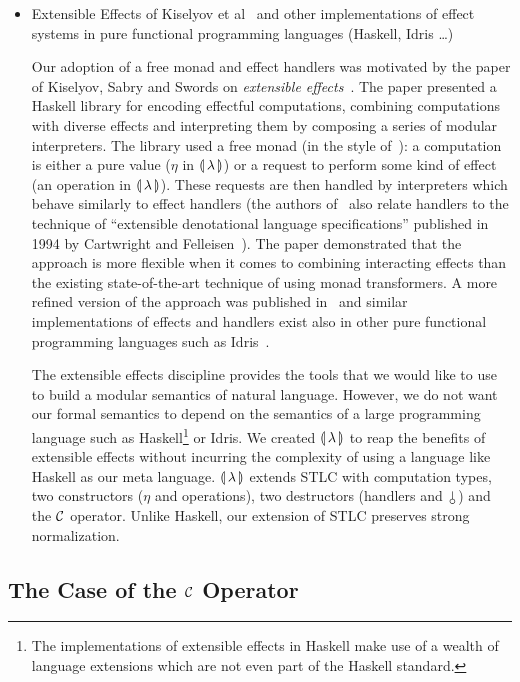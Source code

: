 \begin{itemize}
\item Extensible Effects of Kiselyov et al~\cite{kiselyov2013extensible}
  and other implementations of effect systems in pure functional
  programming languages (Haskell, Idris \ldots)

  Our adoption of a free monad and effect handlers was motivated by the
  paper of Kiselyov, Sabry and Swords on \emph{extensible
    effects}~\cite{kiselyov2013extensible}. The paper presented a Haskell
  library for encoding effectful computations, combining computations with
  diverse effects and interpreting them by composing a series of modular
  interpreters. The library used a free monad (in the style
  of~\cite{swierstra2008data}): a computation is either a pure value
  ($\eta$ in ${\llparenthesis \, \lambda \, \rrparenthesis}$) or a request to perform some kind of effect (an
  operation in ${\llparenthesis \, \lambda \, \rrparenthesis}$). These requests are then handled by interpreters
  which behave similarly to effect handlers (the authors
  of~\cite{kiselyov2013extensible} also relate handlers to the technique of
  ``extensible denotational language specifications'' published in 1994 by
  Cartwright and Felleisen~\cite{cartwright1994extensible}). The paper
  demonstrated that the approach is more flexible when it comes to
  combining interacting effects than the existing state-of-the-art
  technique of using monad transformers. A more refined version of the
  approach was published in~\cite{kiselyov2015freer} and similar
  implementations of effects and handlers exist also in other pure
  functional programming languages such as
  Idris~\cite{brady2013programming}.

  The extensible effects discipline provides the tools that we would like
  to use to build a modular semantics of natural language. However, we do
  not want our formal semantics to depend on the semantics of a large
  programming language such as Haskell\footnote{The implementations of
    extensible effects in Haskell make use of a wealth of language
    extensions which are not even part of the Haskell standard.} or
  Idris. We created ${\llparenthesis \, \lambda \, \rrparenthesis}$ to reap the benefits of extensible effects
  without incurring the complexity of using a language like Haskell as our
  meta language. ${\llparenthesis \, \lambda \, \rrparenthesis}$ extends STLC with computation types, two
  constructors ($\eta$ and operations), two destructors (handlers and
  $\cherry$) and the $\mathcal{C}$ operator. Unlike Haskell, our extension of STLC
  preserves strong normalization.
\end{itemize}


\subsection{The Case of the $\mathcal{C}$ Operator}

